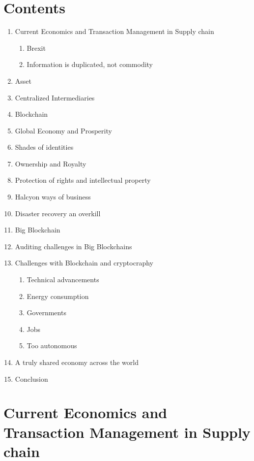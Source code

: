 \section*{Contents}
\begin{enumerate}
\item Current Economics and Transaction Management in Supply chain
\begin{enumerate}
\item Brexit
\item Information is duplicated, not commodity
\end{enumerate}
\item Asset
\item Centralized Intermediaries
\item Blockchain
\item Global Economy and Prosperity
\item Shades of identities
\item Ownership and Royalty
\item Protection of rights and intellectual property
\item Halcyon ways of business
\item Disaster recovery an overkill
\item Big Blockchain
\item Auditing challenges in Big Blockchains
\item Challenges with Blockchain and cryptocraphy
\begin{enumerate}
\item Technical advancements
\item Energy consumption
\item Governments
\item Jobs
\item Too autonomous
\end{enumerate}
\item A truly shared economy across the world
\item Conclusion
\end{enumerate}

\maketitle
\section{Current Economics and Transaction Management in Supply chain}

